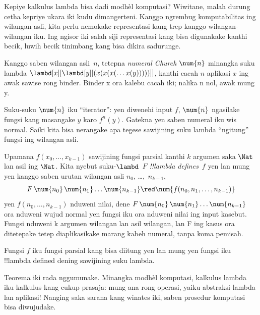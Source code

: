 \documentclass[../../../include/open-logic-section]{subfiles}
\begin{document}

Kepiye kalkulus lambda bisa dadi modhèl komputasi?
Wiwitane, malah durung cetha kepriye ukara iki
kudu dimangerteni. Kanggo ngrembug komputabilitas
ing wilangan asli, kita perlu nemokake representasi
kang trep kanggo wilangan-wilangan iku. Ing ngisor
iki salah siji representasi kang bisa digunakake
kanthi becik, luwih becik tinimbang kang bisa
dikira sadurunge.

\begin{defn}
Kanggo saben wilangan asli~$n$, tetepna
\emph{numeral Church} $\num{n}$ minangka
suku lambda $\lambd[x][\lambd[y][(x(x(x(\dots
x(y)))))]]$, kanthi cacah $n$ aplikasi $x$ ing awak sawise rong binder. Binder x ora kalebu cacah iki; nalika n nol, awak mung y.
\end{defn}

Suku-suku $\num{n}$ iku ``iterator'': yen
diwenehi input $f$, $\num{n}$ ngasilake
fungsi kang masangake $y$ karo $f^n(y)$.
Gatekna yen saben numeral iku wis normal.
Saiki kita bisa nerangake apa tegese sawijining
suku lambda ``ngitung'' fungsi ing wilangan asli.

\begin{defn}
Upamana $f(x_0, \dots, x_{k-1})$ sawijining fungsi
parsial kanthi $k$ argumen saka $\Nat$ lan
asil ing $\Nat$. Kita nyebut suku-$\lambd$~$F$
\emph{!!{lambda define}s}~$f$ yen lan mung yen
kanggo saben urutan wilangan asli $n_0$,
\dots,~$n_{k-1}$,
\[
F\, \num{n_0}\, \num{n_1} \dots \num{n_{k-1}} \red \num{f(n_0, n_1, \dots,
  n_{k-1})}
\]
yen $f(n_0, \dots, n_{k-1})$ nduweni nilai,
dene $F\, \num{n_0}\, \num{n_1}
\dots \num{n_{k-1}}$ ora nduweni wujud
normal yen fungsi iku ora nduweni nilai
ing input kasebut. Fungsi nduweni k argumen wilangan lan asil wilangan, lan F ing kasus ora ditetepake tetep diaplikasikake marang kabeh numeral, tanpa koma pemisah.
\end{defn}

\begin{thm}
Fungsi $f$ iku fungsi parsial kang bisa diitung
yen lan mung yen fungsi iku
!!{lambda defined} dening sawijining suku lambda.
\end{thm}

\begin{explain}
Teorema iki rada nggumunake. Minangka modhèl
komputasi, kalkulus lambda iku kalkulus kang
cukup prasaja: mung ana rong operasi, yaiku
abstraksi lambda lan aplikasi!{} Nanging saka
sarana kang winates iki, saben prosedur komputasi
bisa diwujudake.
\end{explain}
\end{document}
